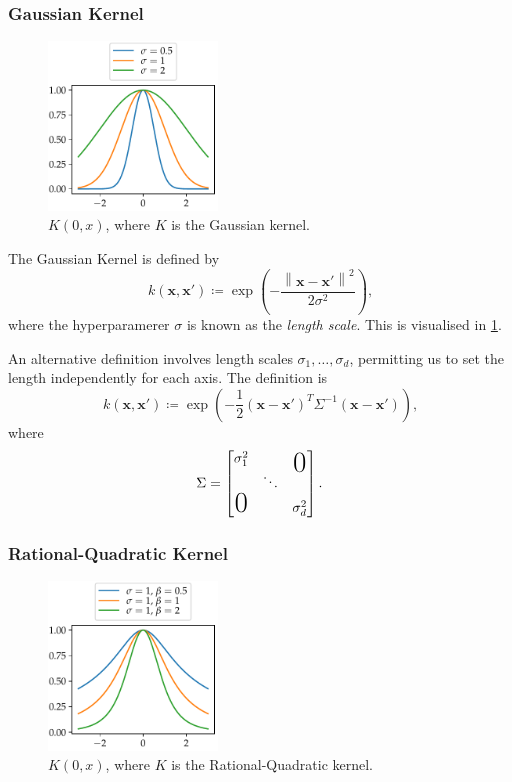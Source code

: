 \documentclass[11pt,twoside]{report}
\newcommand\bx{\mathbf{x}}
\newcommand\norm[1]{\left\|#1\right\|}
\begin{document}
\subsubsection{Gaussian Kernel}

  \begin{figure}
    \centering
    \includegraphics[width=0.4\textwidth]{gaussian_kernel_plot.pdf}
    \caption{$K(0, x)$, where $K$ is the Gaussian kernel.}
    \label{fig:gaussian_kernel}
  \end{figure}

The Gaussian Kernel is defined by \[
    k(\bx, \bx') \coloneqq \exp\left( - \frac{\norm{\bx - \bx'}^2}{2\sigma^2} \right) \text{,}
\] where the hyperparamerer $\sigma$ is known as the \textit{length scale}. This is visualised in \cref{fig:gaussian_kernel}.

An alternative definition involves length scales $\sigma_1, \dots, \sigma_d$, permitting us to set the length independently for each axis. The definition is \[
    k(\bx, \bx') \coloneqq \exp\left( - \frac{1}{2}\left(\bx - \bx'\right)^T\Sigma^{-1}\left(\bx - \bx'\right) \right) \text{,}
\] where \[
    \Sigma = \begin{bmatrix}
        \sigma_1^2 & & \makebox(0,0){\text{\huge0}} \\
        & \ddots & \\
        \mbox{\huge 0} & & \sigma_d^2
    \end{bmatrix} \text{.}
\]

\subsubsection{Rational-Quadratic Kernel}

  \begin{figure}
    \centering
    \includegraphics[width=0.4\textwidth]{rational_quadratic_kernel_plot.pdf}
    \caption{$K(0, x)$, where $K$ is the Rational-Quadratic kernel.}
    \label{fig:rational_quadratic_kernel}
  \end{figure}
\end{document}
